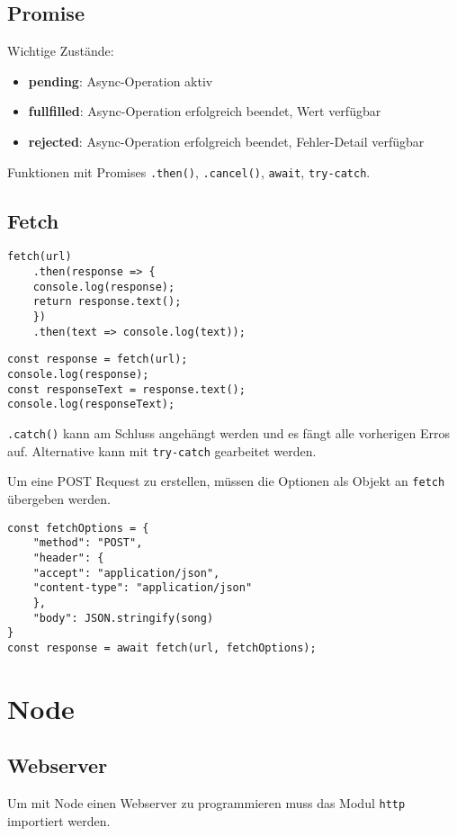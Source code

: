 \documentclass[11pt,twoside,landscape]{article}
\begin{document}
\begin{multicols}{4}
\subsection*{Promise}
\label{sec:orgd593752}
Wichtige Zustände:
\begin{itemize}
\item \textbf{pending}: Async-Operation aktiv
\item \textbf{fullfilled}: Async-Operation erfolgreich beendet, Wert verfügbar
\item \textbf{rejected}: Async-Operation erfolgreich beendet, Fehler-Detail verfügbar
\end{itemize}

Funktionen mit Promises \texttt{.then()}, \texttt{.cancel()}, \texttt{await}, \texttt{try-catch}.

\subsection*{Fetch}
\label{sec:orge04d172}
\begin{verbatim}
fetch(url)
    .then(response => {
	console.log(response);
	return response.text();
    })
    .then(text => console.log(text));
\end{verbatim}

\begin{verbatim}
const response = fetch(url);
console.log(response);
const responseText = response.text();
console.log(responseText);
\end{verbatim}

\texttt{.catch()} kann am Schluss angehängt werden und es fängt alle vorherigen Erros auf. Alternative kann mit \texttt{try-catch} gearbeitet werden.

Um eine POST Request zu erstellen, müssen die Optionen als Objekt an \texttt{fetch} übergeben werden.
\begin{verbatim}
const fetchOptions = {
    "method": "POST",
    "header": {
	"accept": "application/json",
	"content-type": "application/json"
    },
    "body": JSON.stringify(song)
}
const response = await fetch(url, fetchOptions);
\end{verbatim}

\section*{Node}
\label{sec:orgda3e902}
\subsection*{Webserver}
\label{sec:org02df8a2}
Um mit Node einen Webserver zu programmieren muss das Modul \texttt{http} importiert werden.


\end{multicols}
\end{document}
